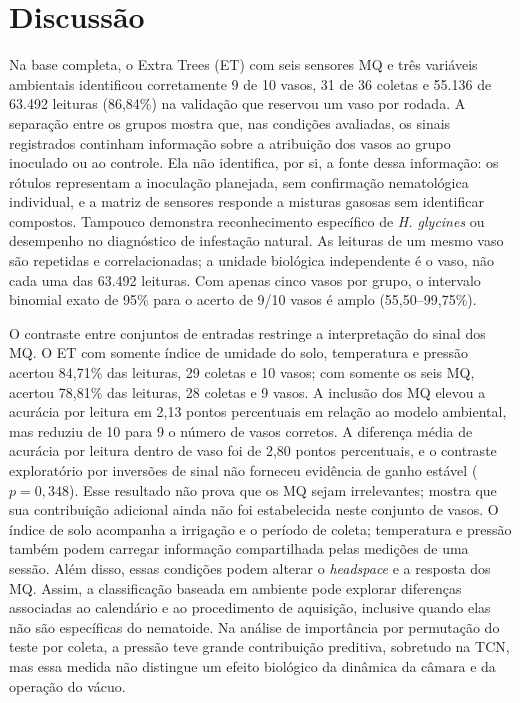 \begingroup
\color{blue}
\section{Discussão}
\label{sec:discussao}

Na base completa, o Extra Trees (ET) com seis sensores MQ e três variáveis
ambientais identificou corretamente 9 de 10 vasos, 31 de 36 coletas e
55.136 de 63.492 leituras (86,84\%) na validação que reservou um vaso por
rodada. A separação entre os grupos mostra que, nas condições avaliadas, os
sinais registrados continham informação sobre a atribuição dos vasos ao
grupo inoculado ou ao controle. Ela não identifica, por si, a fonte dessa
informação: os rótulos representam a inoculação planejada, sem confirmação
nematológica individual, e a matriz de sensores responde a misturas gasosas
sem identificar compostos. Tampouco demonstra reconhecimento específico de
\textit{H. glycines} ou desempenho no diagnóstico de infestação natural.
As leituras de um mesmo vaso são repetidas e correlacionadas; a unidade
biológica independente é o vaso, não cada uma das 63.492 leituras. Com
apenas cinco vasos por grupo, o intervalo binomial exato de 95\% para o
acerto de 9/10 vasos é amplo (55,50--99,75\%).

O contraste entre conjuntos de entradas restringe a interpretação do
sinal dos MQ. O ET com somente índice de umidade do solo, temperatura e
pressão acertou 84,71\% das leituras, 29 coletas e 10 vasos; com somente os
seis MQ, acertou 78,81\% das leituras, 28 coletas e 9 vasos. A inclusão dos
MQ elevou a acurácia por leitura em 2,13 pontos percentuais em relação ao
modelo ambiental, mas reduziu de 10 para 9 o número de vasos corretos.
A diferença média de acurácia por leitura dentro de vaso foi de 2,80
pontos percentuais, e o contraste exploratório por inversões de sinal não
forneceu evidência de ganho estável ($p=0{,}348$). Esse resultado não prova
que os MQ sejam irrelevantes; mostra que sua contribuição adicional ainda
não foi estabelecida neste conjunto de vasos. O índice de solo acompanha
a irrigação e o período de coleta; temperatura e pressão também podem
carregar informação compartilhada pelas medições de uma sessão. Além
disso, essas condições podem alterar o \textit{headspace} e a resposta dos
MQ. Assim, a classificação baseada em ambiente pode explorar diferenças
associadas ao calendário e ao procedimento de aquisição, inclusive quando
elas não são específicas do nematoide. Na análise de importância por
permutação do teste por coleta, a pressão teve grande contribuição
preditiva, sobretudo na TCN, mas essa medida não distingue um efeito
biológico da dinâmica da câmara e da operação do vácuo.

